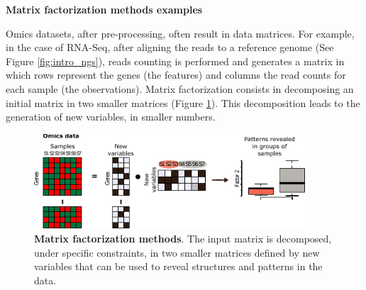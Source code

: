 \textbf{Matrix factorization methods examples} \newline

Omics datasets, after pre-processing, often result in data matrices. For example, in the case of \gls{RNA-Seq}, after aligning the reads to a reference genome (See Figure \ref{fig:intro_ngs}), reads counting is performed and generates a matrix in which rows represent the genes (the features) and columns the read counts for each sample (the observations).  Matrix factorization consists in decomposing an initial matrix in two smaller matrices (Figure \ref{fig:intro_MF}). This decomposition leads to the generation of new variables, in smaller numbers. %

\begin{figure}[H]
    \centering
    \includegraphics[width=0.9\textwidth]{Figures/Intro/MF_methods.pdf}
    \caption[Matrix factorization]{\textbf{Matrix factorization methods}. The input matrix is decomposed, under specific constraints, in two smaller matrices defined by new variables that can be used to reveal structures and patterns in the data.}
    \label{fig:intro_MF}
\end{figure}

